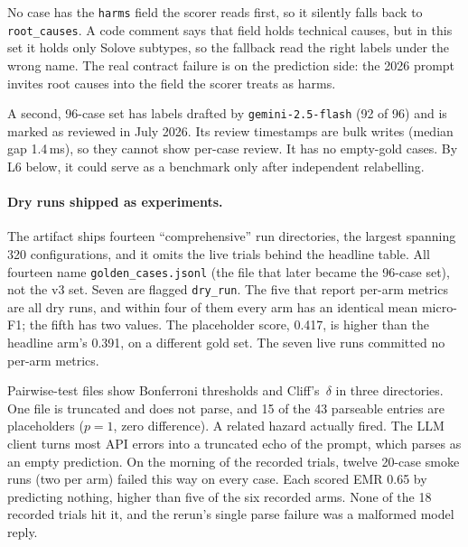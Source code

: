 \documentclass[10pt,twocolumn]{article}
\begin{document}
No case has the \texttt{harms} field the scorer reads first, so it silently
falls back to \texttt{root\_causes}. A code comment says that field holds
technical causes, but in this set it holds only Solove subtypes, so the
fallback read the right labels under the wrong name. The real contract failure
is on the prediction side: the 2026 prompt invites root causes into the field
the scorer treats as harms.

A second, 96-case set has labels drafted by \texttt{gemini-2.5-flash} (92 of
96) and is marked as reviewed in July 2026. Its review timestamps are bulk
writes (median gap 1.4\,ms), so they cannot show per-case review. It has no
empty-gold cases. By L6 below, it could serve as a benchmark only after
independent relabelling.

\paragraph{Dry runs shipped as experiments.} The artifact ships fourteen
``comprehensive'' run directories, the largest spanning 320 configurations,
and it omits the live trials behind the headline table. All fourteen name
\texttt{golden\_cases.jsonl} (the file that later became the 96-case set), not
the v3 set. Seven are flagged \texttt{dry\_run}. The five that report per-arm
metrics are all dry runs, and within four of them every arm has an identical
mean micro-F1; the fifth has two values. The placeholder score, 0.417, is
higher than the headline arm's 0.391, on a different gold set. The seven live
runs committed no per-arm metrics.

Pairwise-test files show Bonferroni thresholds and Cliff's~$\delta$ in three
directories. One file is truncated and does not parse, and 15 of the 43
parseable entries are placeholders ($p = 1$, zero difference). A related hazard
actually fired. The LLM client turns most API errors into a truncated echo of
the prompt, which parses as an empty prediction. On the morning of the recorded
trials, twelve 20-case smoke runs (two per arm) failed this way on every case.
Each scored EMR 0.65 by predicting nothing, higher than five of the six
recorded arms. None of the 18 recorded trials hit it, and the rerun's single
parse failure was a malformed model reply.
\end{document}
